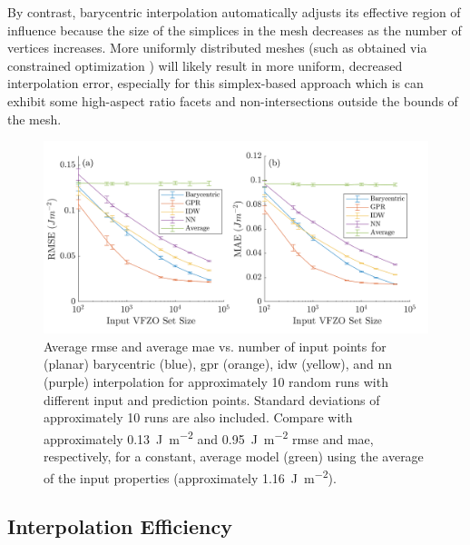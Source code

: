 \documentclass[final,twocolumn,12pt]{elsarticle}
\newcommand{\inpt}{input}
\newcommand{\outpt}{prediction}
\begin{document}
By contrast, barycentric interpolation automatically adjusts its effective region of influence because the size of the simplices in the mesh decreases as the number of vertices increases. More uniformly distributed meshes (such as obtained via constrained optimization \cite{dolanBenchmarkingOptimizationSoftware2004,ConstrainedElectrostaticNonlinear2020}) will likely result in more uniform, decreased interpolation error, especially for this simplex-based approach which is can exhibit some high-aspect ratio facets and non-intersections outside the bounds of the mesh. %


\begin{figure}
    \centering
    \includegraphics[scale=1]{brkerror.png}
    \caption{Average \gls{rmse} and average \gls{mae} vs. number of \inpt{} points for (planar) barycentric (blue), \gls{gpr} (orange), \gls{idw} (yellow), and \gls{nn} (purple) interpolation for approximately 10 random runs with different \inpt{} and \outpt{} points. Standard deviations of approximately 10 runs are also included. Compare with approximately \SI{0.13}{\J\per\square\meter} and \SI{0.95}{\J\per\square\meter} \gls{rmse} and \gls{mae}, respectively, for a constant, average model (green) using the average of the \inpt{} properties (approximately \SI{1.16}{\J\per\square\meter}).}
    \label{fig:brkerror}
\end{figure}

\subsection{Interpolation Efficiency}
\label{sec:results:efficiency}
\end{document}
